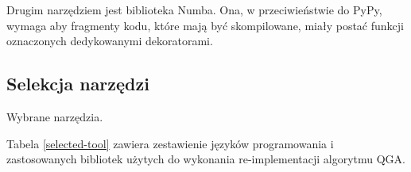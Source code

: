 \documentclass[11pt, a4paper]{article}
\begin{document}
\begin{sloppypar}

    Drugim narzędziem jest biblioteka Numba\cite{Numba_Article}\cite{Numba_Doc}. Ona, w
    przeciwieństwie do PyPy, wymaga aby fragmenty kodu, które mają być skompilowane, miały
    postać funkcji oznaczonych dedykowanymi dekoratorami.



    \subsection{Selekcja narzędzi}
    \FloatBarrier
    \begin{table}[ht]
      \centering
      
      \caption{Wybrane narzędzia.}
      \label{selected-tool}
    \end{table}
    \FloatBarrier

    Tabela \ref{selected-tool} zawiera zestawienie języków programowania i zastosowanych
    bibliotek użytych do wykonania re-implementacji algorytmu QGA.


\end{sloppypar}
\end{document}

